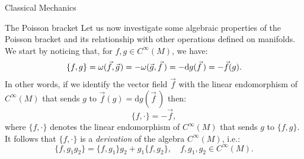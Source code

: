 \documentclass[oneside,a4paper,11pt]{amsbook}
\newcommand{\dd}{\mathrm d}
\newcommand{\microspace}{\mskip1mu}
\theoremstyle{remark}\newtheorem{exercise}{Exercise}[chapter]
\theoremstyle{plain}\newtheorem{teo}{Theorem}[section]
\theoremstyle{plain}\newtheorem{lem}[teo]{Lemma}
\theoremstyle{plain}\newtheorem{prop}[teo]{Proposition}
\theoremstyle{plain}\newtheorem{cor}[teo]{Corollary}
\theoremstyle{definition}\newtheorem{defin}[teo]{Definition}
\theoremstyle{remark}\newtheorem{rem}[teo]{Remark}
\theoremstyle{definition}\newtheorem{notation}[teo]{Notation}
\theoremstyle{definition}\newtheorem{convention}[teo]{Convention}
\theoremstyle{definition}\newtheorem{example}[teo]{Example}
\numberwithin{section}{chapter}
\numberwithin{equation}{section}
\begin{document}
\begin{chapter}{Classical Mechanics}
\begin{section}{The Poisson bracket}
Let us now investigate some algebraic properties of the Poisson bracket and its relationship with other operations
defined on manifolds. We start by noticing that, for $f,g\in C^\infty(M)$, we have:
\[\{f,g\}=\omega(\vec f,\vec g\microspace)=-\omega(\vec g,\vec f\,)=-\dd g(\vec f\,)=-\vec f(g).\]
In other words, if we identify the vector field $\vec f$ with the linear endomorphism of $C^\infty(M)$ that sends
$g$ to $\vec f(g)=\dd g(\vec f\,)$ then:
\begin{equation}\label{eq:Poissonvec}
\{f,\cdot\}=-\vec f,
\end{equation}
where $\{f,\cdot\}$ denotes the linear endomorphism of $C^\infty(M)$ that sends $g$ to $\{f,g\}$. It follows that $\{f,\cdot\}$ is a {\em derivation\/}
of the algebra $C^\infty(M)$, i.e.:
\begin{equation}\label{eq:Poifderiv}
\{f,g_1g_2\}=\{f,g_1\}g_2+g_1\{f,g_2\},\quad f,g_1,g_2\in C^\infty(M).
\end{equation}


\end{section}
\end{chapter}
\end{document}
